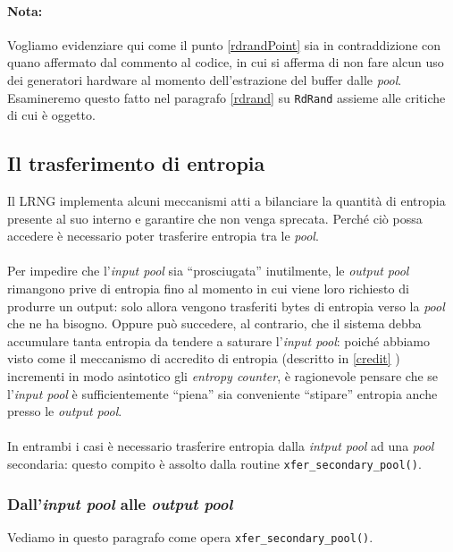 \documentclass{article}
\begin{document}
 \paragraph{Nota:}Vogliamo evidenziare qui come il punto \ref{rdrandPoint} sia
 in contraddizione con quano affermato dal commento al codice, in cui si afferma
 di non fare alcun uso dei generatori hardware al momento dell'estrazione del
 buffer dalle \emph{pool}. Esamineremo questo fatto nel paragrafo \ref{rdrand}
 su \verb+RdRand+ assieme alle critiche di cui è oggetto.
 
 \subsection{Il trasferimento di entropia}\label{trasferimentoentropia}
 Il LRNG implementa alcuni meccanismi atti a bilanciare la quantità di
 entropia presente al suo interno e garantire che non venga
 sprecata. Perché ciò possa accedere è necessario poter trasferire entropia tra
 le \emph{pool}.
  
 \paragraph{}Per impedire che l'\emph{input pool} sia
 ``prosciugata'' inutilmente, le \emph{output pool} rimangono prive di entropia
 fino al momento in cui viene loro richiesto di produrre un output: solo allora
 vengono trasferiti bytes di entropia verso la
 \emph{pool} che ne ha bisogno.
 Oppure può succedere, al contrario, che il sistema debba accumulare tanta
 entropia da tendere a saturare l'\emph{input pool}: poiché abbiamo visto come
 il meccanismo di accredito di entropia (descritto in \ref{credit} ) incrementi
 in modo asintotico gli \emph{entropy counter}, è ragionevole pensare che se
 l'\emph{input pool} è sufficientemente ``piena'' sia conveniente ``stipare''
 entropia anche presso le \emph{output pool}.
 
 \paragraph{}In entrambi i casi è necessario trasferire entropia dalla
 \emph{intput pool} ad una \emph{pool} secondaria: questo compito è assolto
 dalla routine \verb+xfer_secondary_pool()+.
 
 
 \subsubsection{Dall'\emph{input pool} alle \emph{output
 pool}}\label{trasf_input_output}
 Vediamo in questo paragrafo come opera \verb+xfer_secondary_pool()+.
 
\end{document}
